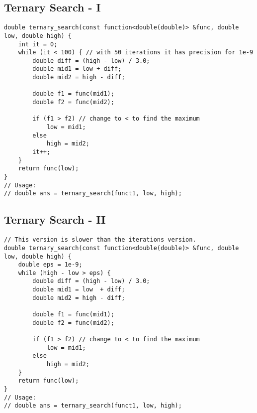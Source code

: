 \documentclass[10pt,letterpaper,twocolumn,twosided]{article}
\begin{document}
\subsection{Ternary Search - I}
\begin{lstlisting}
double ternary_search(const function<double(double)> &func, double low, double high) {
    int it = 0;
    while (it < 100) { // with 50 iterations it has precision for 1e-9
        double diff = (high - low) / 3.0;
        double mid1 = low + diff;
        double mid2 = high - diff;

        double f1 = func(mid1);
        double f2 = func(mid2);

        if (f1 > f2) // change to < to find the maximum
            low = mid1;
        else
            high = mid2;
        it++;
    }
    return func(low);
}
// Usage:
// double ans = ternary_search(funct1, low, high);
\end{lstlisting}

\subsection{Ternary Search - II}
\begin{lstlisting}
// This version is slower than the iterations version.
double ternary_search(const function<double(double)> &func, double low, double high) {
    double eps = 1e-9;
    while (high - low > eps) {
        double diff = (high - low) / 3.0;
        double mid1 = low  + diff;
        double mid2 = high - diff;

        double f1 = func(mid1);
        double f2 = func(mid2);

        if (f1 > f2) // change to < to find the maximum
            low = mid1;
        else
            high = mid2;
    }
    return func(low);
}
// Usage:
// double ans = ternary_search(funct1, low, high);
\end{lstlisting}
\end{document}
